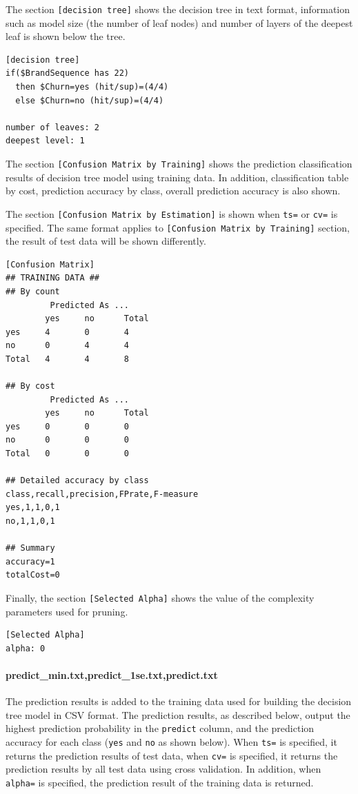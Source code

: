 The section \verb|[decision tree]| shows the decision tree in text format, information such as  model size (the number of leaf nodes) and number of layers of the deepest leaf is shown below the tree.


\begin{Verbatim}[baselinestretch=0.7,frame=single]
[decision tree]
if($BrandSequence has 22)
  then $Churn=yes (hit/sup)=(4/4)
  else $Churn=no (hit/sup)=(4/4)

number of leaves: 2
deepest level: 1
\end{Verbatim}

 The section \verb|[Confusion Matrix by Training]| shows the prediction classification results of decision tree model using training data. In addition, classification table by cost, prediction accuracy by class, overall prediction accuracy is also shown. 

The section \verb|[Confusion Matrix by Estimation]| is shown when \verb|ts=| or \verb|cv=| is specified. The same format applies to \verb|[Confusion Matrix by Training]| section, the result of test data will be shown differently. 

\newpage
\begin{Verbatim}[baselinestretch=0.7,frame=single]
[Confusion Matrix]
## TRAINING DATA ##
## By count
         Predicted As ...
        yes     no      Total
yes     4       0       4
no      0       4       4
Total   4       4       8

## By cost
         Predicted As ...
        yes     no      Total
yes     0       0       0
no      0       0       0
Total   0       0       0

## Detailed accuracy by class
class,recall,precision,FPrate,F-measure
yes,1,1,0,1
no,1,1,0,1

## Summary
accuracy=1
totalCost=0
\end{Verbatim}

Finally, the section \verb|[Selected Alpha]| shows the value of the complexity parameters used for pruning.

\begin{Verbatim}[baselinestretch=0.7,frame=single]
[Selected Alpha]
alpha: 0
\end{Verbatim}


\paragraph{predict\_min.txt,predict\_1se.txt,predict.txt}
The prediction results is added to the training data used for building the decision tree model in CSV format. The prediction results, as described below, output the highest prediction probability in the \verb|predict| column, and the prediction accuracy for each class (\verb|yes| and \verb|no| as shown below). When \verb|ts=| is specified, it returns the prediction results of test data, when \verb|cv=| is specified, it returns the prediction results by all test data using cross validation. In addition, when \verb|alpha=| is specified,  the prediction result of the training data is returned.  


